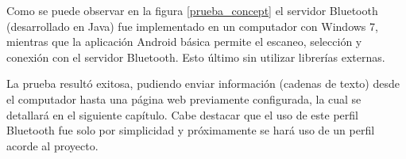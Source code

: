 Como se puede observar en la figura \ref{prueba_concept} el servidor Bluetooth (desarrollado en Java) fue implementado en un computador con Windows 7, mientras que la aplicación Android básica permite el escaneo, selección y conexión con el servidor Bluetooth. Esto último sin utilizar librerías externas.

La prueba resultó exitosa, pudiendo enviar información (cadenas de texto) desde el computador hasta una página web previamente configurada, la cual se detallará en el siguiente capítulo. Cabe destacar que el uso de este perfil Bluetooth fue solo por simplicidad y próximamente se hará uso de un perfil acorde al proyecto.